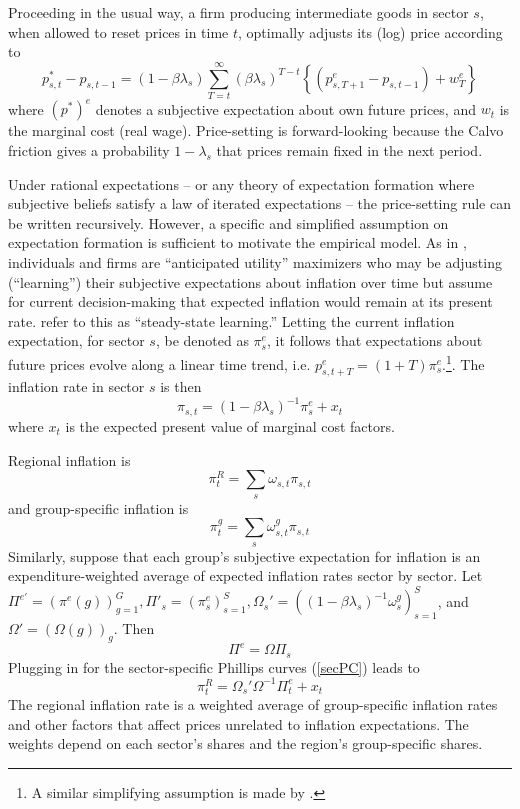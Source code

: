 \documentclass[12pt]{article}
\begin{document}
Proceeding in the usual way, a firm producing intermediate goods in sector $s$, when allowed to reset prices in time $t$, optimally adjusts its (log) price according to
$$p^*_{s,t} - p_{s,t-1}= \left( 1-\beta\lambda_s\right)\sum_{T=t}^{\infty}\left(\beta\lambda_s\right)^{T-t}\left\{ \left(p^e_{s,T+1}-p_{s,t-1}\right) + w^e_{T}\right\}$$
where $(p^*)^e$ denotes a subjective expectation about own future prices, and $w_t$ is the marginal cost (real wage). Price-setting is forward-looking because the Calvo friction gives a probability $1-\lambda_s$ that prices remain fixed in the next period.  

Under rational expectations -- or any theory of expectation formation where subjective beliefs satisfy a law of iterated expectations -- the price-setting rule can be written recursively. However, a specific and simplified assumption on expectation formation is sufficient to motivate the empirical model. As in \cite{Woodford:annualreview}, individuals and firms are ``anticipated utility'' maximizers who may be adjusting (``learning'') their subjective expectations about inflation over time but assume for current decision-making that expected inflation would remain at its present rate. \cite{EvansHonkap-book} refer to this as ``steady-state learning.'' Letting the current inflation expectation, for sector $s$, be denoted as $\pi^e_s$, it follows that expectations about future prices evolve along a linear time trend, i.e. $p^e_{s,t+T} = (1+T)\pi^e_s$.\footnote{A similar simplifying assumption is made by \cite{Werning:expectsWP}.}. The inflation rate in sector $s$ is then
\begin{equation}\label{secPC}
 \pi_{s,t} = \left(1-\beta\lambda_s\right)^{-1} \pi^e_{s} + x_t
 \end{equation}
where $x_t$ is the expected present value of marginal cost factors.

Regional inflation is 
$$\pi^R_t = \sum_{s}\omega_{s,t}\pi_{s,t}$$
and group-specific inflation is
$$ \pi^g_t = \sum_s\omega^g_{s,t}\pi_{s,t}$$
Similarly, suppose that each group's subjective expectation for inflation is an expenditure-weighted average of expected inflation rates sector by sector. Let $\Pi^{e'}=\left(\pi^e(g)\right)_{g=1}^{G}, \Pi'_s=\left(\pi^e_s\right)_{s=1}^{S}, \Omega_s' = \left(\left(1-\beta\lambda_s\right)^{-1}\omega^g_s\right)_{s=1}^{S}$, and $\Omega' = \left(\Omega(g)\right)_g$. Then
\begin{equation}\label{Ident}
 \Pi^e = \Omega\Pi_s
\end{equation}
Plugging in for the sector-specific Phillips curves (\ref{secPC}) leads to
\begin{equation}\label{LOM}
\pi^R_t = \Omega_s'\Omega^{-1}\Pi^e_t + x_t
\end{equation}
The regional inflation rate is a weighted average of group-specific inflation rates and other factors that affect prices unrelated to inflation expectations. The weights depend on each sector's shares and the region's group-specific shares.
\end{document}
